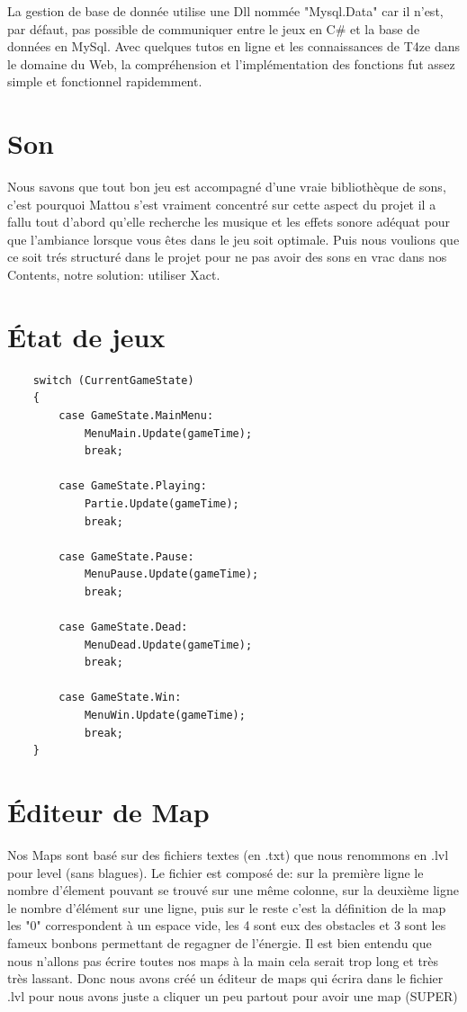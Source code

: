 \documentclass [11pt]{report}
\begin{document}
	La gestion de base de donnée utilise une Dll nommée "Mysql.Data" car il n'est, par défaut, pas possible de communiquer entre le jeux en C\# et la base de données en MySql. 
	Avec quelques tutos en ligne et les connaissances de T4ze dans le domaine du Web, la compréhension et l'implémentation des fonctions fut assez simple et fonctionnel rapidemment.
	
	
	


	\section{Son}
	Nous savons que tout bon jeu est accompagné d'une vraie bibliothèque de sons, c'est pourquoi Mattou s'est vraiment concentré sur cette aspect du projet il a fallu tout d'abord qu'elle recherche les musique et les effets sonore adéquat pour que l'ambiance lorsque vous êtes dans le jeu soit optimale. Puis nous voulions que ce soit trés structuré dans le projet pour ne pas avoir des sons en vrac dans nos Contents, notre solution: utiliser Xact. 
	
	
	
	
	
	\section{\'Etat de jeux}
			
			
		
	\begin{Verbatim}
	switch (CurrentGameState)
	{
		case GameState.MainMenu:
			MenuMain.Update(gameTime);
			break;
		
		case GameState.Playing:
			Partie.Update(gameTime);
			break;
		
		case GameState.Pause:
			MenuPause.Update(gameTime);
			break;
		
		case GameState.Dead:
			MenuDead.Update(gameTime);		
			break;
		
		case GameState.Win:
			MenuWin.Update(gameTime);
			break;
	}
	\end{Verbatim}
	
	
	
	
	
	
	\section{\'Editeur de Map}
	Nos Maps sont basé sur des fichiers textes (en .txt) que nous renommons en .lvl pour level (sans blagues). Le fichier est composé de: sur la première ligne le nombre d'élement pouvant se trouvé sur une même colonne, sur la deuxième ligne le nombre d'élément sur une ligne, puis sur le reste c'est la définition de la map %
	les "0" correspondent à un espace vide, les 4 sont eux des obstacles et 3 sont les fameux bonbons permettant de regagner de l'énergie.
	\indent Il est bien entendu que nous n'allons pas écrire toutes nos maps à la main cela serait trop long et très très lassant. Donc nous avons créé un éditeur de maps qui écrira dans le fichier .lvl pour nous avons juste a cliquer un peu partout pour avoir une map (SUPER) %
	 
\end{document}
